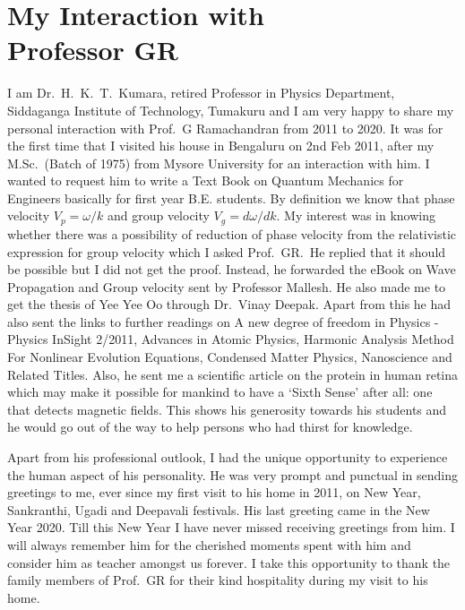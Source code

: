 \chapter[My Interaction with Prof.\ GR]{My Interaction with\\ Professor GR}


I am Dr.\ H.\ K.\ T.\ Kumara, retired Professor in Physics Department, Siddaganga Institute of Technology, Tumakuru and I am very happy to share my personal interaction with Prof.\ G Ramachandran from 2011 to 2020. It was for the first time that I visited his house in Bengaluru on 2nd Feb 2011, after my M.Sc.\ (Batch of 1975) from Mysore University for an interaction with him. I wanted to request him to write a Text Book on Quantum Mechanics for Engineers basically for first year B.E. students. By definition we know that phase velocity $V_p=\omega/k$ and group velocity $V_g=d\omega/dk$.  My interest was in knowing whether there was a possibility of reduction of phase velocity from the relativistic expression for group velocity which I asked Prof.\ GR.\  He replied that it should be possible but I did not get the proof. Instead, he forwarded the eBook on Wave Propagation and Group velocity sent by Professor Mallesh.  He also made me to get the thesis of Yee Yee Oo through Dr.\ Vinay Deepak. Apart from this he had also sent the links to further readings on A new degree of freedom in Physics - Physics InSight 2/2011, Advances in Atomic Physics, Harmonic Analysis Method For Nonlinear Evolution Equations, Condensed Matter Physics, Nanoscience and Related Titles.  Also, he sent me a scientific article on the protein in human retina which may make it possible for mankind to have a ‘Sixth Sense’ after all: one that detects magnetic fields. This shows his generosity towards his students and he would go out of the way to help persons who had thirst for knowledge. 

Apart from his professional outlook, I had the unique opportunity to experience the human aspect of his personality.  He was very prompt and punctual in sending greetings to me, ever since my first visit to his home in 2011, on New Year, Sankranthi, Ugadi and Deepavali festivals.  His last greeting came in the New Year 2020.  Till this New Year I have never missed receiving greetings from him. I will always remember him for the cherished  moments spent with him and consider him as teacher amongst us forever. I take this opportunity to thank the family members of Prof.\ GR for their kind hospitality during my visit to his home.
\vskip 0.5cm

